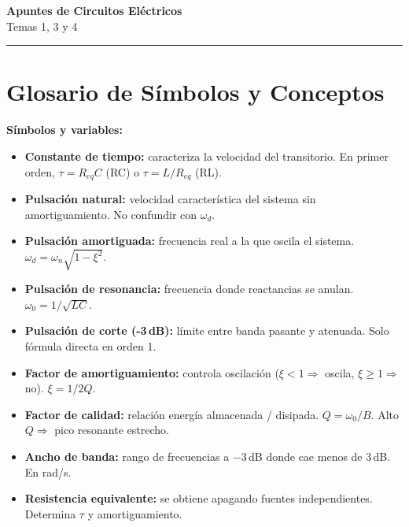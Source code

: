 \documentclass[12pt,a4paper]{article}
\begin{document}
\begin{center}
  {\huge\bfseries\color{mainblue} Apuntes de Circuitos Eléctricos}\\[0.4em]
  {\large\color{gray} Temas 1, 3 y 4}\\[0.3em]
  \color{rulegray}\rule{0.6\linewidth}{1pt}
\end{center}
\vspace{1em}

\section*{Glosario de Símbolos y Conceptos}

\textbf{\color{mainblue}Símbolos y variables:}

\begin{itemize}[leftmargin=2em, itemsep=3pt, parsep=0pt]
  \item[$\tau$] \textbf{Constante de tiempo:} caracteriza la velocidad del transitorio. En primer orden, $\tau = R_{eq}C$ (RC) o $\tau = L/R_{eq}$ (RL).
  \item[$\omega_n$] \textbf{Pulsación natural:} velocidad característica del sistema sin amortiguamiento. No confundir con $\omega_d$.
  \item[$\omega_d$] \textbf{Pulsación amortiguada:} frecuencia real a la que oscila el sistema. $\omega_d = \omega_n\sqrt{1-\xi^2}$.
  \item[$\omega_0$] \textbf{Pulsación de resonancia:} frecuencia donde reactancias se anulan. $\omega_0 = 1/\sqrt{LC}$.
  \item[$\omega_c$] \textbf{Pulsación de corte (-3\,dB):} límite entre banda pasante y atenuada. Solo fórmula directa en orden 1.
  \item[$\xi$] \textbf{Factor de amortiguamiento:} controla oscilación ($\xi < 1 \Rightarrow$ oscila, $\xi \geq 1 \Rightarrow$ no). $\xi = 1/2Q$.
  \item[$Q$] \textbf{Factor de calidad:} relación energía almacenada / disipada. $Q = \omega_0/B$. Alto $Q \Rightarrow$ pico resonante estrecho.
  \item[$B$] \textbf{Ancho de banda:} rango de frecuencias a $-3$\,dB donde cae menos de 3\,dB. En rad/s.
  \item[$R_{eq}$] \textbf{Resistencia equivalente:} se obtiene apagando fuentes independientes. Determina $\tau$ y amortiguamiento.
\end{itemize}
\end{document}
